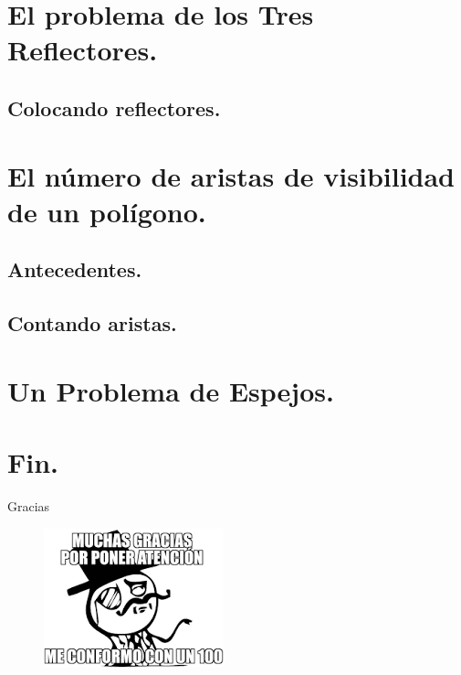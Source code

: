 \documentclass{beamer}
\begin{document}
\section{El problema de los Tres Reflectores.} %
\subsection{Colocando reflectores.}




\section{El número de aristas de visibilidad de un polígono.}
\subsection{Antecedentes.}

\subsection{Contando aristas.}



\section{Un Problema de Espejos.}


\section{Fin.}
%    
%  


\begin{frame}{Gracias}
  \begin{figure}
    \centering
    \includegraphics[width=.35 \paperwidth]{./images/Agradecimientos.png}
  \end{figure}

\end{frame}
\end{document}
